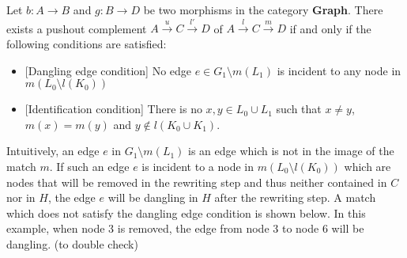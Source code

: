 \begin{proposition}
    Let $b: A\rightarrow B$ and $g : B \rightarrow D$ be two morphisms in the category \textbf{Graph}. There exists a pushout complement $A \overset{u}{\rightarrow} C \overset{l'}{\rightarrow} D$ of $A \overset{l}{\rightarrow} C \overset{m}{\rightarrow} D$ if and only if the following conditions are satisfied:
    \begin{itemize}
        \item{[Dangling edge condition]} No edge $e \in G_1 \setminus m(L_1)$ is incident to any node in $m(L_0 \setminus l(K_0))$
        \item{[Identification condition]} There is no $x,y \in L_0 \cup L_1$ such that $x \not = y$, $m(x) = m(y)$ and $y \notin l(K_0 \cup K_1)$.
    \end{itemize}
\end{proposition}
Intuitively, an edge $e$ in $G_1 \setminus m(L_1)$ is an edge which is not in the image of the match $m$. If such an edge $e$ is incident to a node in $m(L_0 \setminus l(K_0))$ which are nodes that will be removed in the rewriting step and thus neither contained in $C$ nor in $H$, the edge $e$ will be dangling in $H$ after the rewriting step. A match which does not satisfy the dangling edge condition is shown below. In this example, when node 3 is removed, the edge from node 3 to node 6 will be dangling. (to double check)

